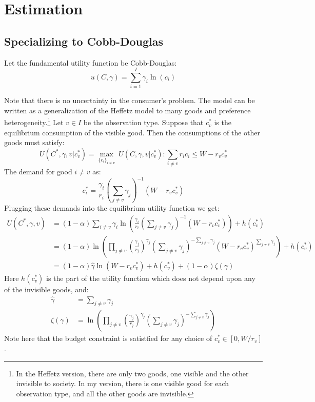 \documentclass[12pt]{article}
\begin{document}
\section{Estimation}
\subsection{Specializing to Cobb-Douglas}
Let the fundamental utility function be Cobb-Douglas:
\[u(C,\gamma) = \sum_{i=1}^{I} \gamma_i \ln(c_i)\]

Note that there is no uncertainty in the consumer's problem.
The model can be written as a generalization of the Heffetz model to many goods and preference heterogeneity.\footnote{ In the Heffetz version, there are only two goods, one visible and the other invisible to society. In my version, there is one visible good for each observation type, and all the other goods are invisible.}
Let $v\in I$ be the observation type.
Suppose that $c_v^*$ is the equilibrium consumption of the visible good.
Then the consumptions of the other goods must satisfy:
\[ U(C^*,\gamma,v|c_v^*)=\underset{\{c_i\}_{i\neq v}}{\max} \ U(C,\gamma,v|c_v^*) :  \sum_{i \neq v} r_i c_i \le W-r_v c_v^*\]
The demand for good $i\neq v$ as:
\[ c_i^* = \frac{\gamma_i}{r_i}\left(\sum_{j\neq v} \gamma_j\right)^{-1}\left(W-r_v c_v^* \right)\]
Plugging these demands into the equilibrium utility function we get:
\begin{align}
	U(C^*,\gamma,v) &= (1-\alpha)\sum_{i\neq v} \gamma_i \ln\left(\frac{\gamma_i}{r_i}\left(\sum_{j\neq v} \gamma_j\right)^{-1}\left(W-r_v c_v^* \right)\right) + h(c_v^*) \nonumber \\ 
	&= (1-\alpha) \ln\left(\prod_{j\neq v} \left(\frac{\gamma_j}{r_j}\right)^{\gamma_j}\left(\sum_{j\neq v} \gamma_j\right)^{-\sum_{j\neq v} \gamma_j}\left(W-r_v c_v^* \right)^{\sum_{j\neq v} \gamma_j}\right) + h(c_v^*) \nonumber \\ 
	\label{invop}
	&= (1-\alpha) \hat{\gamma} \ln \left(W-r_v c_v^*\right) + h(c_v^*) + (1-\alpha) \zeta(\gamma) 
\end{align}
Here $h(c_v^*)$ is the part of the utility function which does not depend upon any of the invisible goods, and:
\begin{align*}
	\hat{\gamma} &= \sum_{j\neq v} \gamma_j\\
	\zeta(\gamma) & = \ln\left(\prod_{j\neq v} \left(\frac{\gamma_j}{r_j}\right)^{\gamma_j}\left(\sum_{j\neq v} \gamma_j\right)^{-\sum_{j\neq v} \gamma_j}\right) 
\end{align*}
Note here that the budget constraint is satistfied for any choice of $c_v^* \in [0,W/r_v]$.
\end{document}
